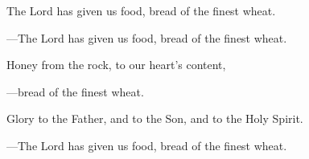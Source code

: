 \responsory
\begin{hangpar}

The Lord has given us food, bread of the finest wheat.

{\color{red}---\thinspace}The Lord has given us food, bread of the finest wheat.

\medskip Honey from the rock, to our heart’s content,

{\color{red}---\thinspace}bread of the finest wheat.

\medskip Glory to the Father, and to the Son, and to the Holy Spirit.

{\color{red}---\thinspace}The Lord has given us food, bread of the finest wheat.
\end{hangpar}
